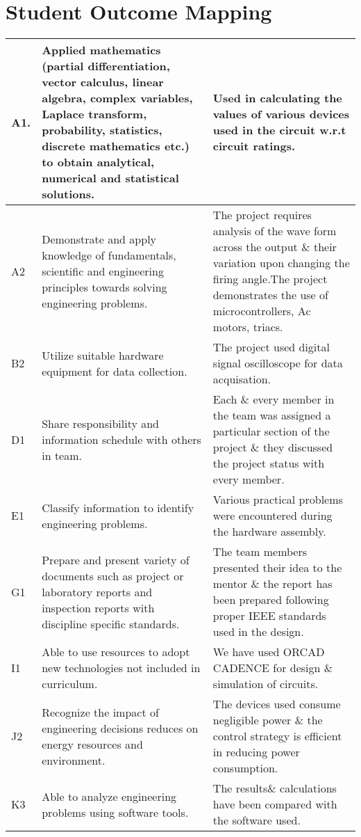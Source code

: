         \section{Student Outcome Mapping}
        	\begin{table}[h!]
        		\begin{tabular}{|m{0.75cm}|m{2.75in}|m{2.75in}|}\hline
        		A1.&Applied mathematics (partial differentiation, vector calculus, linear algebra, complex variables, Laplace transform, probability, statistics, discrete mathematics etc.) to obtain analytical, numerical and statistical solutions.& Used in calculating the values of various devices used in the circuit w.r.t circuit ratings.\\\hline
        		A2 & Demonstrate and apply knowledge of fundamentals, scientific and engineering principles towards solving engineering problems.& The project requires analysis of the wave form across the output \& their variation upon changing the firing angle.The project demonstrates the use of microcontrollers, Ac motors, triacs.\\\hline
        		B2 & Utilize suitable hardware equipment for data collection.& The project used digital signal oscilloscope for data acquisation. \\\hline
          		D1 & Share responsibility and information schedule with others in team.& Each \& every member in the team was assigned a particular section of the project \& they discussed the project status with every member.\\\hline
        		E1 & Classify information to identify engineering problems.& Various practical problems were encountered during the hardware assembly.\\\hline
        		G1 & Prepare and present variety of documents such as project or laboratory reports and inspection reports with discipline specific standards.& The team members presented their idea to the mentor \& the report has been prepared following proper IEEE standards used in the design. \\\hline
        		I1 & Able to use resources to adopt new technologies not included in curriculum.& We have used ORCAD CADENCE for design \& simulation of circuits.\\\hline
        		J2 & Recognize the impact of engineering decisions reduces on energy resources and environment.& The devices used consume negligible power \& the control strategy is efficient in reducing power consumption.\\\hline
        		K3 & Able to analyze engineering problems using software tools.& The results\& calculations have been compared with the software used. \\\hline
        		\end{tabular}
        	\end{table}
    